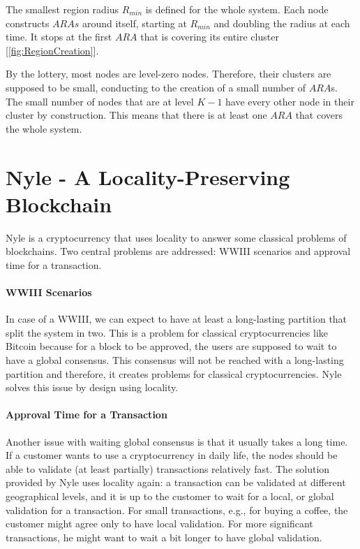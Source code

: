 \documentclass[a4paper,11pt,twoside,openright]{report}
\begin{document}
The smallest region radius $R_{min}$ is defined for the whole system. Each node
constructs $ARAs$ around itself, starting at $R_{min}$ and doubling the
radius at each time. It stops at the first $ARA$ that is covering its entire
cluster [\autoref{fig:RegionCreation}]. 

By the lottery, most nodes are level-zero nodes. Therefore, their clusters are
supposed to be small, conducting to the creation of a small number of $ARA$s.
The small number of nodes that are at level $K-1$ have every other node
in their cluster by construction. This means that there is  at least one
$ARA$ that covers the whole system. 

\section{Nyle - A Locality-Preserving Blockchain}

Nyle is a cryptocurrency that uses locality to answer some classical problems
of blockchains. Two central problems are addressed: WWIII scenarios and approval
time for a transaction.
 
\paragraph{WWIII Scenarios} \label{WWIII} In case of a WWIII, we can expect to
have at least a long-lasting partition that split the system in two. This
is a problem for classical cryptocurrencies like Bitcoin \cite{Nakamoto2009}
because for a block to be approved, the users are supposed to wait to have a
global consensus. This consensus will not be reached with a long-lasting
partition and therefore, it creates problems for classical cryptocurrencies.
Nyle solves this issue by design using locality.

\paragraph{Approval Time for a Transaction} \label{approve_time} Another issue
with waiting global consensus is that it usually takes a long time. If a
customer wants to use a cryptocurrency in daily life, the nodes should be able
to validate (at least partially) transactions relatively fast. The solution
provided by Nyle uses locality again: a transaction can be validated
at different geographical levels, and it is up to the customer to wait for a
local, or global validation for a transaction. For small transactions, e.g., for buying a coffee, the customer might agree only to have local
validation. For more significant transactions, he might want to wait a bit longer to have
global validation.
\end{document}
